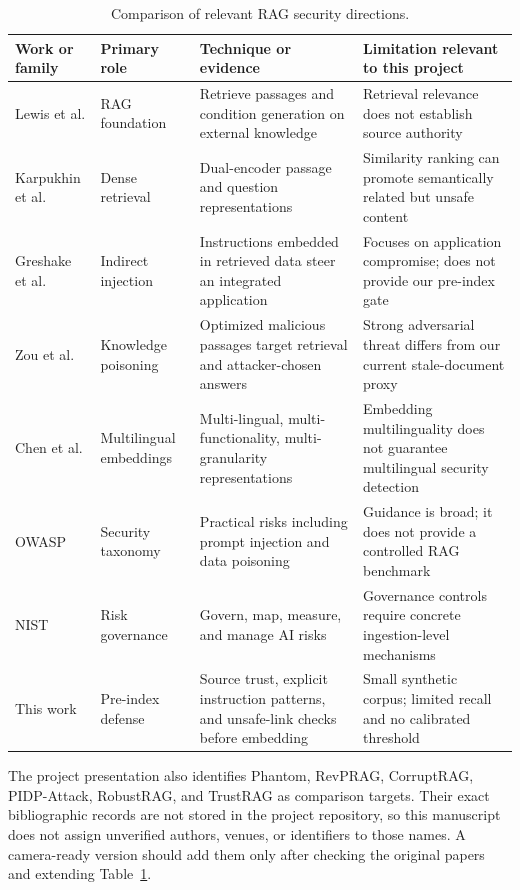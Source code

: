 \documentclass[conference]{IEEEtran}
\begin{document}
\begin{table}[t]
\centering
\caption{Comparison of relevant RAG security directions.}
\label{tab:literature}
\small
\begin{tabular}{p{2.2cm}p{3.0cm}p{3.5cm}p{4.0cm}}
\toprule
Work or family & Primary role & Technique or evidence & Limitation relevant to this project \\
\midrule
Lewis et al. \cite{lewis2020rag} & RAG foundation & Retrieve passages and condition generation on external knowledge & Retrieval relevance does not establish source authority \\
Karpukhin et al. \cite{karpukhin2020dpr} & Dense retrieval & Dual-encoder passage and question representations & Similarity ranking can promote semantically related but unsafe content \\
Greshake et al. \cite{greshake2023indirect} & Indirect injection & Instructions embedded in retrieved data steer an integrated application & Focuses on application compromise; does not provide our pre-index gate \\
Zou et al. \cite{zou2024poisonedrag} & Knowledge poisoning & Optimized malicious passages target retrieval and attacker-chosen answers & Strong adversarial threat differs from our current stale-document proxy \\
Chen et al. \cite{chen2024bgem3} & Multilingual embeddings & Multi-lingual, multi-functionality, multi-granularity representations & Embedding multilinguality does not guarantee multilingual security detection \\
OWASP \cite{owasp2025llm} & Security taxonomy & Practical risks including prompt injection and data poisoning & Guidance is broad; it does not provide a controlled RAG benchmark \\
NIST \cite{nist2023airmf} & Risk governance & Govern, map, measure, and manage AI risks & Governance controls require concrete ingestion-level mechanisms \\
This work & Pre-index defense & Source trust, explicit instruction patterns, and unsafe-link checks before embedding & Small synthetic corpus; limited recall and no calibrated threshold \\
\bottomrule
\end{tabular}
\end{table}

The project presentation also identifies Phantom, RevPRAG, CorruptRAG, PIDP-Attack, RobustRAG, and TrustRAG as comparison targets. Their exact bibliographic records are not stored in the project repository, so this manuscript does not assign unverified authors, venues, or identifiers to those names. A camera-ready version should add them only after checking the original papers and extending Table~\ref{tab:literature}.
\end{document}
